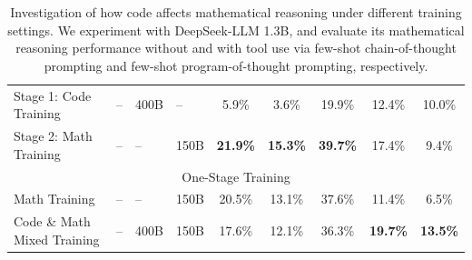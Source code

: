 \begin{table}[t!]
{\begin{tabular}{llllccccc}
\midrule
Stage 1: Code Training    & --                              & 400B                         & --                           & 5.9\%  & 3.6\%  & 19.9\%         & 12.4\%        & 10.0\%             \\
Stage 2: Math Training    & --                              & --                           & 150B                         & \textbf{21.9\%}  &  \textbf{15.3\%}  & \textbf{39.7\%}         & 17.4\%       & 9.4\%             \\ 
\midrule
\midrule
\multicolumn{9}{c}{One-Stage Training}                                                                                                                                                          \\ 
\midrule
Math Training             & --                              & --                           & 150B                         & 20.5\% & 13.1\% & 37.6\%         & 11.4\%       & 6.5\%             \\
\midrule
Code \& Math Mixed Training & --                              & 400B                         & 150B                         &     17.6\%   &   12.1\%     &    36.3\%            &      \textbf{19.7\%}      &    \textbf{13.5\%}            \\
\bottomrule
\end{tabular}
    }
    \caption{
    Investigation of how code affects mathematical reasoning under different training settings.
    We experiment with DeepSeek-LLM 1.3B, and evaluate its mathematical reasoning performance without and with tool use via few-shot chain-of-thought prompting and few-shot program-of-thought prompting, respectively.
    }
    \label{tab:code-math}
\end{table}
\endgroup

